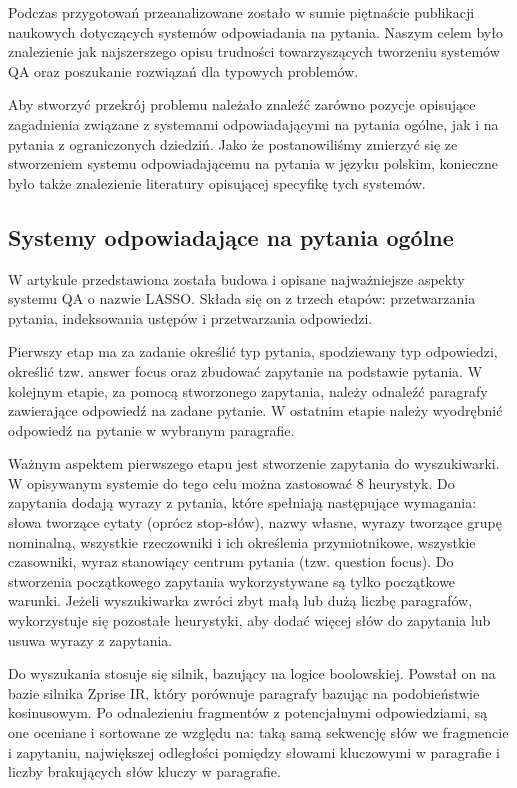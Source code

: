 
Podczas przygotowań przeanalizowane zostało w sumie piętnaście publikacji naukowych dotyczących systemów odpowiadania na pytania. Naszym celem było znalezienie jak najszerszego opisu trudności towarzyszących tworzeniu systemów QA oraz poszukanie rozwiązań dla typowych problemów. 

Aby stworzyć przekrój problemu należało znaleźć zarówno pozycje opisujące zagadnienia związane z systemami odpowiadającymi na pytania ogólne, jak i na pytania z ograniczonych dziedziń. Jako że postanowiliśmy zmierzyć się ze stworzeniem systemu odpowiadającemu na pytania w języku polskim, konieczne było także znalezienie literatury opisującej specyfikę tych systemów.

\subsection{Systemy odpowiadające na pytania ogólne}\label{subsec:lit:op}

W artykule \cite{moldovan-etal-2000-structure} przedstawiona została budowa i opisane najważniejsze aspekty systemu QA o nazwie LASSO. Składa się on z trzech etapów: przetwarzania pytania, indeksowania ustępów i przetwarzania odpowiedzi. 

Pierwszy etap ma za zadanie określić typ pytania, spodziewany typ odpowiedzi, określić tzw. answer focus oraz zbudować zapytanie na podstawie pytania. W kolejnym etapie, za pomocą stworzonego zapytania,  należy odnaleźć paragrafy zawierające odpowiedź na zadane pytanie. W ostatnim etapie należy wyodrębnić odpowiedź na pytanie w wybranym paragrafie.

Ważnym aspektem pierwszego etapu jest stworzenie zapytania do wyszukiwarki. W opisywanym systemie do tego celu można zastosować 8 heurystyk. Do zapytania dodają wyrazy z pytania, które spełniają następujące wymagania: słowa tworzące cytaty (oprócz stop-słów), nazwy własne, wyrazy tworzące grupę nominalną, wszystkie rzeczowniki i ich określenia przymiotnikowe, wszystkie czasowniki, wyraz stanowiący centrum pytania (tzw. question focus). Do stworzenia początkowego zapytania wykorzystywane są tylko początkowe warunki. Jeżeli wyszukiwarka zwróci zbyt małą lub dużą liczbę paragrafów, wykorzystuje się pozostałe heurystyki, aby dodać więcej słów do zapytania lub usuwa wyrazy z zapytania. 

Do wyszukania stosuje się silnik, bazujący na logice boolowskiej.  Powstał on na bazie silnika Zprise IR, który porównuje paragrafy bazując na podobieństwie kosinusowym. Po odnalezieniu fragmentów z potencjalnymi odpowiedziami, są one oceniane i sortowane ze względu na: taką samą sekwencję słów we fragmencie i zapytaniu, największej odległości pomiędzy słowami kluczowymi w paragrafie i liczby brakujących słów kluczy w paragrafie. 

